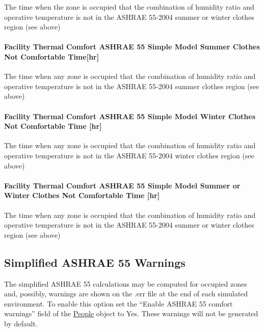 The time when the zone is occupied that the combination of humidity ratio and operative temperature is not in the ASHRAE 55-2004 summer or winter clothes region (see above)

\paragraph{Facility Thermal Comfort ASHRAE 55 Simple Model Summer Clothes Not Comfortable Time{[}hr{]}}\label{facility-thermal-comfort-ashrae-55-simple-model-summer-clothes-not-comfortable-timehr}

The time when any zone is occupied that the combination of humidity ratio and operative temperature is not in the ASHRAE 55-2004 summer clothes region (see above)

\paragraph{Facility Thermal Comfort ASHRAE 55 Simple Model Winter Clothes Not Comfortable Time {[}hr{]}}\label{facility-thermal-comfort-ashrae-55-simple-model-winter-clothes-not-comfortable-time-hr}

The time when any zone is occupied that the combination of humidity ratio and operative temperature is not in the ASHRAE 55-2004 winter clothes region (see above)

\paragraph{Facility Thermal Comfort ASHRAE 55 Simple Model Summer or Winter Clothes Not Comfortable Time {[}hr{]}}\label{facility-thermal-comfort-ashrae-55-simple-model-summer-or-winter-clothes-not-comfortable-time-hr}

The time when any zone is occupied that the combination of humidity ratio and operative temperature is not in the ASHRAE 55-2004 summer or winter clothes region (see above)

\subsection{Simplified ASHRAE 55 Warnings}\label{simplified-ashrae-55-warnings}

The simplified ASHRAE 55 calculations may be computed for occupied zones and, possibly, warnings are shown on the .err file at the end of each simulated environment. To enable this option set the ``Enable ASHRAE 55 comfort warnings'' field of the \hyperref[people]{People} object to Yes. These warnings will not be generated by default.

